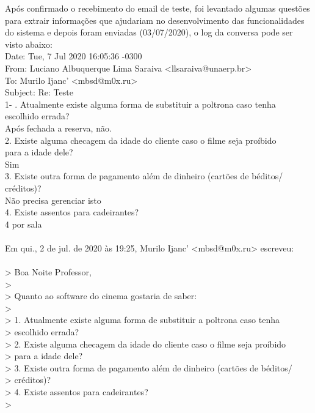 \documentclass[12pt,a4paper]{article}
\begin{document}
Após confirmado o recebimento do email de teste, foi levantado algumas questões
para extrair informações que ajudariam no desenvolvimento das funcionalidades do 
sistema e depois foram enviadas (03/07/2020), o log da conversa pode ser visto abaixo:\\

Date: Tue, 7 Jul 2020 16:05:36 -0300\\
From: Luciano Albuquerque Lima Saraiva <llsaraiva@unaerp.br>\\
To: Murilo Ijanc' <mbsd@m0x.ru>\\
Subject: Re: Teste\\

1- . Atualmente existe alguma forma de substituir a poltrona caso tenha\\
escolhido errada?\\
Após fechada a reserva, não.\\
2. Existe alguma checagem da idade do cliente caso o filme seja proíbido\\
para a idade dele?\\
Sim\\
3. Existe outra forma de pagamento além de dinheiro (cartões de béditos/\\
créditos)?\\
Não precisa gerenciar isto\\
4. Existe assentos para cadeirantes?\\
4 por sala\\
\\
Em qui., 2 de jul. de 2020 às 19:25, Murilo Ijanc' <mbsd@m0x.ru> escreveu:\\
\\
> Boa Noite Professor,\\
>\\
> Quanto ao software do cinema gostaria de saber:\\
>\\
> 1. Atualmente existe alguma forma de substituir a poltrona caso tenha\\
> escolhido errada?\\
> 2. Existe alguma checagem da idade do cliente caso o filme seja proíbido\\
> para a idade dele?\\
> 3. Existe outra forma de pagamento além de dinheiro (cartões de béditos/\\
> créditos)?\\
> 4. Existe assentos para cadeirantes?\\
>\\
\end{document}

